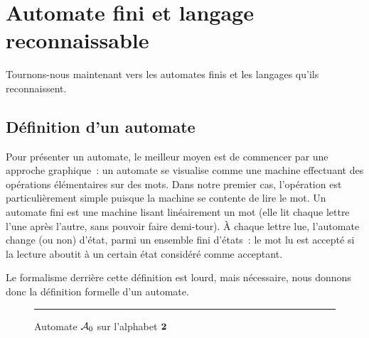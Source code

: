 \section{Automate fini et langage reconnaissable}

\noindent
Tournons-nous maintenant vers les automates finis et les langages qu'ils
reconnaissent.

\subsection{Définition d'un automate}

Pour présenter un automate, le meilleur moyen est de commencer par une approche
graphique~: un automate se visualise comme une machine effectuant des opérations
élémentaires sur des mots. Dans notre premier cas, l'opération est
particulièrement simple puisque la machine se contente de lire le mot. Un
automate fini est une machine lisant linéairement un mot (elle lit chaque lettre
l'une après l'autre, sans pouvoir faire demi-tour). \`A chaque lettre lue,
l'automate change (ou non) d'état, parmi un ensemble fini d'états~: le mot lu
est accepté si la lecture aboutit à un certain état considéré comme acceptant.

Le formalisme derrière cette définition est lourd, mais nécessaire, nous donnons
donc la définition formelle d'un automate.

\begin{figure}[t]
  \centering
  
  \vspace{0.2cm}
  \hrule

  \vspace{0.2cm}
  \caption{Automate $\mathcal{A}_0$ sur l'alphabet $\bm{2}$}
  \label{fig.A0}
  
\end{figure}


